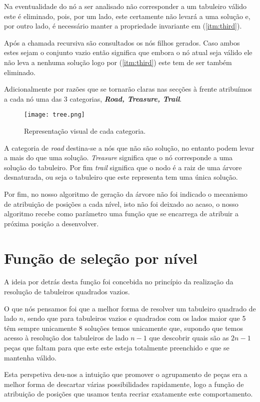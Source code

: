 \documentclass[a4paper]{report} %
\begin{document}
Na eventualidade do nó a ser analisado não corresponder a um tabuleiro válido este é eliminado, pois, por um lado, este certamente não levará a uma solução e, por outro lado, é necessário manter a propriedade invariante em (\ref{itm:third}).

Após a chamada recursiva são consultados os nós filhos gerados. Caso ambos estes sejam o conjunto vazio então significa que embora o nó atual seja válido ele não leva a nenhuma solução logo por (\ref{itm:third}) este tem de ser também eliminado. 

Adicionalmente por razões que se tornarão claras nas secções à frente atribuímos a cada nó uma das 3 categorias, \textbf{\textit{Road, Treasure, Trail}}.

\begin{figure}[h]
    \centering
    \texttt{[image: tree.png]}
    \caption{Representação visual de cada categoria.}
\end{figure}

A categoria de \textit{road} destina-se a nós que não são solução, no entanto podem levar a mais do que uma solução. \textit{Treasure} significa que o nó corresponde a uma solução do tabuleiro. Por fim \textit{trail} significa que o nodo é a raiz de uma árvore desnaturada, ou seja o tabuleiro que este representa tem uma única solução.

Por fim, no nosso algoritmo de geração da árvore não foi indicado o mecanismo de atribuição de posições a cada nível, isto não foi deixado ao acaso, o nosso algoritmo recebe como parâmetro uma função que se encarrega de atribuir a próxima posição a desenvolver.

\chapter{Função de seleção por nível}

A ideia por detrás desta função foi concebida no princípio da realização da resolução de tabuleiros quadrados vazios.

O que nós pensamos foi que a melhor forma de resolver um tabuleiro quadrado de lado $n$, sendo que para tabuleiros vazios e quadrados com os lados maior que 5 têm sempre unicamente 8 soluções temos unicamente que, supondo que temos acesso à resolução dos tabuleiros de lado $n-1$ que descobrir quais são as $2n-1$ peças que faltam para que este este esteja totalmente preenchido e que se mantenha válido.

Esta perspetiva deu-nos a intuição que promover o agrupamento de peças era a melhor forma de descartar várias possibilidades rapidamente, logo a função de atribuição de posições que usamos tenta recriar exatamente este comportamento.
\end{document}
